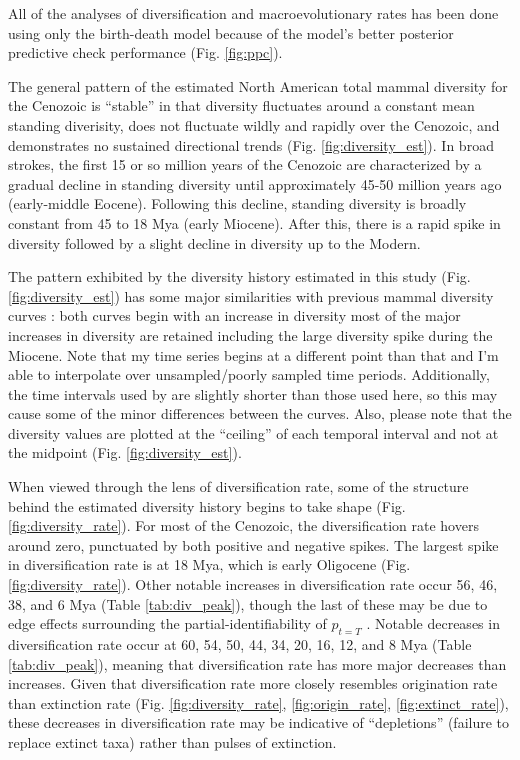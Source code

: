 \documentclass[12pt,letterpaper]{article}
\begin{document}
All of the analyses of diversification and macroevolutionary rates has been done using only the birth-death model because of the model's better posterior predictive check performance (Fig. \ref{fig:ppc}).


The general pattern of the estimated North American total mammal diversity for the Cenozoic is ``stable'' in that diversity fluctuates around a constant mean standing diverisity, does not fluctuate wildly and rapidly over the Cenozoic, and demonstrates no sustained directional trends (Fig. \ref{fig:diversity_est}). In broad strokes, the first 15 or so million years of the Cenozoic are characterized by a gradual decline in standing diversity until approximately 45-50 million years ago (early-middle Eocene). Following this decline, standing diversity is broadly constant from 45 to 18 Mya (early Miocene). After this, there is a rapid spike in diversity followed by a slight decline in diversity up to the Modern. 

The pattern exhibited by the diversity history estimated in this study (Fig. \ref{fig:diversity_est}) has some major similarities with previous mammal diversity curves \citep{Alroy2009}: both curves begin with an increase in diversity most of the major increases in diversity are retained including the large diversity spike during the Miocene. Note that my time series begins at a different point than that \citet{Alroy2009} and I'm able to interpolate over unsampled/poorly sampled time periods. Additionally, the time intervals used by \citet{Alroy2009} are slightly shorter than those used here, so this may cause some of the minor differences between the curves. Also, please note that the diversity values are plotted at the ``ceiling'' of each temporal interval and not at the midpoint (Fig. \ref{fig:diversity_est}).

When viewed through the lens of diversification rate, some of the structure behind the estimated diversity history begins to take shape (Fig. \ref{fig:diversity_rate}). For most of the Cenozoic, the diversification rate hovers around zero, punctuated by both positive and negative spikes. The largest spike in diversification rate is at 18 Mya, which is early Oligocene (Fig. \ref{fig:diversity_rate}). Other notable increases in diversification rate occur 56, 46, 38, and 6 Mya (Table \ref{tab:div_peak}), though the last of these may be due to edge effects surrounding the partial-identifiability of \(p_{t = T}\) . Notable decreases in diversification rate occur at 60, 54, 50, 44, 34, 20, 16, 12, and 8 Mya (Table \ref{tab:div_peak}), meaning that diversification rate has more major decreases than increases. Given that diversification rate more closely resembles origination rate than extinction rate (Fig. \ref{fig:diversity_rate}, \ref{fig:origin_rate}, \ref{fig:extinct_rate}), these decreases in diversification rate may be indicative of ``depletions'' (failure to replace extinct taxa) rather than pulses of extinction.
\end{document}
